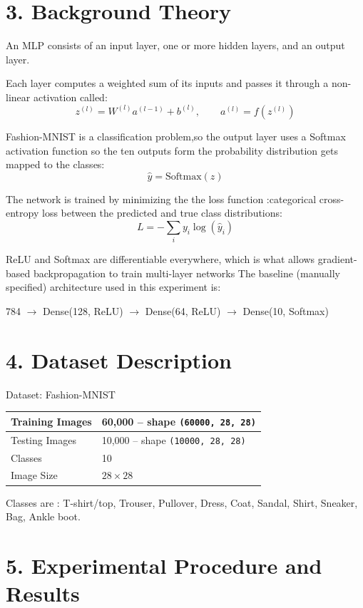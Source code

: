 \documentclass[11pt]{article}
\begin{document}
\section*{3. Background Theory}
An MLP consists of an input layer, one or more hidden layers, and an output layer.

Each layer computes a weighted sum of its inputs and passes it through a non-linear activation called:
\[
z^{(l)}=W^{(l)}a^{(l-1)}+b^{(l)},\qquad
a^{(l)}=f(z^{(l)})
\]

Fashion-MNIST is a classification problem,so the output layer uses a Softmax activation function so the
ten outputs form the   probability distribution gets mapped to   the classes:
\[
\hat y=\mathrm{Softmax}(z)
\]

The network is trained by minimizing the the loss function :categorical cross-entropy loss between the predicted and
true class distributions:
\[
L=-\sum_i y_i\log(\hat y_i)
\]

 ReLU and Softmax are differentiable 
everywhere, which is  what allows gradient-based backpropagation to train multi-layer networks
The baseline (manually specified) architecture used in this experiment is:
\begin{center}
784 $\rightarrow$ Dense(128, ReLU) $\rightarrow$ Dense(64, ReLU) $\rightarrow$ Dense(10, Softmax)
\end{center}



\section*{4. Dataset Description}
Dataset: Fashion-MNIST

\begin{center}
\begin{tabular}{|l|l|}
\hline
Training Images & 60,000 -- shape \texttt{(60000, 28, 28)} \\ \hline
Testing Images & 10,000 -- shape \texttt{(10000, 28, 28)} \\ \hline
Classes & 10 \\ \hline
Image Size & $28\times28$ \\ \hline
\end{tabular}
\end{center}

Classes are : T-shirt/top, Trouser, Pullover, Dress, Coat, Sandal, Shirt, Sneaker, Bag, Ankle boot.

\section*{5. Experimental Procedure and Results}
\end{document}
